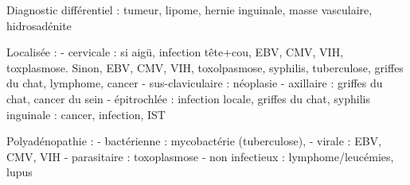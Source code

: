 \documentclass{article}
\begin{document}
{Diagnostic différentiel : tumeur, lipome, hernie inguinale, masse vasculaire,
hidrosadénite

Localisée :
- cervicale : si aigü, infection tête+cou, EBV, CMV, VIH, toxplasmose. Sinon,
EBV, CMV, VIH, toxolpasmose, syphilis, tuberculose, griffes du chat, lymphome,
cancer
- sus-claviculaire : néoplasie
- axillaire : griffes du chat, cancer du sein
- épitrochlée : infection locale, griffes du chat, syphilis
inguinale : cancer, infection, IST

Polyadénopathie :
- bactérienne : mycobactérie (tuberculose),
- virale : EBV, CMV, VIH
- parasitaire : toxoplasmose
- non infectieux : lymphome/leucémies, lupus





}
\end{document}
